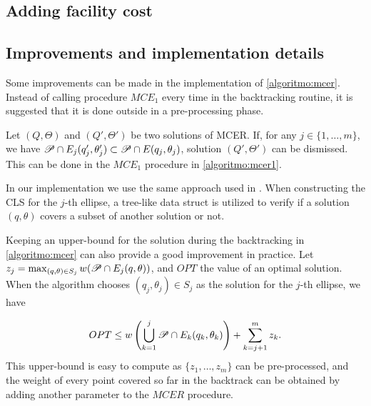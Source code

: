 \subsection{Adding facility cost}



\subsection{Improvements and implementation details}

Some improvements can be made in the implementation of \autoref{algoritmo:mcer}.
Instead of calling procedure $MCE_1$ every time in the backtracking routine, it is suggested that it is done outside in a pre-processing phase.

Let $(Q, \Theta)$ and $(Q', \Theta')$ be two solutions of MCER. If, for any $j \in \{1, \dots, m\}$, we have $\mathscr{P} \cap E_j(q_j', \theta_j') \subset \mathscr{P} \cap E(q_j, \theta_j)$, solution $(Q', \Theta')$ can be dismissed. This can be done in the $MCE_1$ procedure in \autoref{algoritmo:mcer1}. 

In our implementation we use the same approach used in . When constructing the CLS for the $j$-th ellipse, a tree-like data struct is utilized to verify if a solution $(q, \theta)$ covers a subset of another solution or not.

Keeping an upper-bound for the solution during the backtracking in \autoref{algoritmo:mcer} can also provide a good improvement in practice. Let $z_j = \max_{(q, \theta) \in S_j} w(\mathscr{P} \cap E_j(q, \theta))$, and $OPT$ the value of an optimal solution. When the algorithm chooses $(q_j, \theta_j) \in S_j$ as the solution for the $j$-th ellipse, we have

\begin{equation}
OPT \le w\left(\bigcup_{k=1}^{j} \mathscr{P} \cap E_k(q_k, \theta_k)\right) + \sum_{k=j+1}^m z_k.
\end{equation}
This upper-bound is easy to compute as $\{z_1, \dots, z_m\}$ can be pre-processed, and the weight of every point covered so far in the backtrack can be obtained by adding another parameter to the $MCER$ procedure.